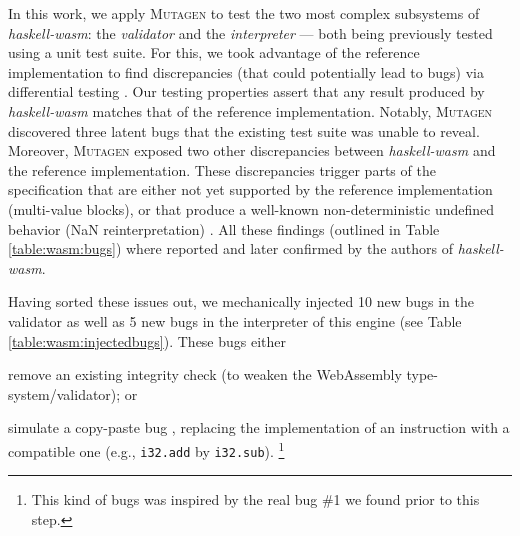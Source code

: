 \documentclass[sigconf,review,anonymous]{acmart}
\newcommand{\mutagen}{\textsc{Mutagen}\xspace}
\begin{document}
In this work, we apply \mutagen to test the two most complex subsystems of
\textit{haskell-wasm}: the \emph{validator} and the \emph{interpreter} --- both
being previously tested using a unit test suite.
%
%
For this, we took advantage of the reference implementation to find
discrepancies (that could potentially lead to bugs) via differential testing
\cite{mckeeman1998differential}.
%
Our testing properties assert that any result produced by \textit{haskell-wasm}
matches that of the reference implementation.
%
Notably, \mutagen discovered three latent bugs 
that the existing test suite was unable to reveal.
%
%
Moreover, \mutagen exposed two other discrepancies between \textit{haskell-wasm}
and the reference implementation.
%
These discrepancies trigger parts of the specification that are either not yet
supported by the reference implementation (multi-value blocks), or that produce
a well-known non-deterministic undefined behavior (NaN reinterpretation)
\cite{perenyi2020stack}.
%
All these findings (outlined in Table \ref{table:wasm:bugs}) where reported and
later confirmed by the authors of \textit{haskell-wasm}.
%


Having sorted these issues out, we mechanically injected 10 new bugs in the
validator as well as 5 new bugs in the interpreter of this engine (see Table
\ref{table:wasm:injectedbugs}).
%
These bugs either
%
\begin{inparaenum}
\item remove an existing integrity check (to weaken the WebAssembly
  type-system/validator); or
\item simulate a copy-paste bug \cite{chou2001empirical},
  replacing the implementation of an instruction with a compatible one
  (e.g., \texttt{i32.add} by \texttt{i32.sub}).%
  \footnote{This kind of bugs was inspired by the real bug \#1 we found prior to
    this step.}
\end{inparaenum}




\end{document}
